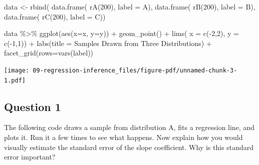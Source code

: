 \documentclass[
  letterpaper,
  DIV=11,
  numbers=noendperiod]{scrreprt}
\newenvironment{Shaded}{\begin{snugshade}}{\end{snugshade}}
\newcommand{\AttributeTok}[1]{\textcolor[rgb]{0.40,0.45,0.13}{#1}}
\newcommand{\DecValTok}[1]{\textcolor[rgb]{0.68,0.00,0.00}{#1}}
\newcommand{\FunctionTok}[1]{\textcolor[rgb]{0.28,0.35,0.67}{#1}}
\newcommand{\NormalTok}[1]{\textcolor[rgb]{0.00,0.23,0.31}{#1}}
\newcommand{\OtherTok}[1]{\textcolor[rgb]{0.00,0.23,0.31}{#1}}
\newcommand{\SpecialCharTok}[1]{\textcolor[rgb]{0.37,0.37,0.37}{#1}}
\newcommand{\StringTok}[1]{\textcolor[rgb]{0.13,0.47,0.30}{#1}}
\begin{document}
\begin{Shaded}
\begin{Highlighting}[]
\NormalTok{data }\OtherTok{\textless{}{-}} \FunctionTok{rbind}\NormalTok{( }
  \FunctionTok{data.frame}\NormalTok{( }\FunctionTok{rA}\NormalTok{(}\DecValTok{200}\NormalTok{), }\AttributeTok{label =} \StringTok{\textquotesingle{}A\textquotesingle{}}\NormalTok{),}
  \FunctionTok{data.frame}\NormalTok{( }\FunctionTok{rB}\NormalTok{(}\DecValTok{200}\NormalTok{), }\AttributeTok{label =} \StringTok{\textquotesingle{}B\textquotesingle{}}\NormalTok{),}
  \FunctionTok{data.frame}\NormalTok{( }\FunctionTok{rC}\NormalTok{(}\DecValTok{200}\NormalTok{), }\AttributeTok{label =} \StringTok{\textquotesingle{}C\textquotesingle{}}\NormalTok{))}
\end{Highlighting}
\end{Shaded}

\begin{Shaded}
\begin{Highlighting}[]
\NormalTok{data }\SpecialCharTok{\%\textgreater{}\%} 
  \FunctionTok{ggplot}\NormalTok{(}\FunctionTok{aes}\NormalTok{(}\AttributeTok{x=}\NormalTok{x, }\AttributeTok{y=}\NormalTok{y)) }\SpecialCharTok{+} 
  \FunctionTok{geom\_point}\NormalTok{() }\SpecialCharTok{+} 
  \FunctionTok{lims}\NormalTok{(}
    \AttributeTok{x =} \FunctionTok{c}\NormalTok{(}\SpecialCharTok{{-}}\DecValTok{2}\NormalTok{,}\DecValTok{2}\NormalTok{), }
    \AttributeTok{y =} \FunctionTok{c}\NormalTok{(}\SpecialCharTok{{-}}\DecValTok{1}\NormalTok{,}\DecValTok{1}\NormalTok{)) }\SpecialCharTok{+} 
  \FunctionTok{labs}\NormalTok{(}\AttributeTok{title =} \StringTok{\textquotesingle{}Samples Drawn from Three Distributions\textquotesingle{}}\NormalTok{) }\SpecialCharTok{+} 
  \FunctionTok{facet\_grid}\NormalTok{(}\AttributeTok{rows=}\FunctionTok{vars}\NormalTok{(label))}
\end{Highlighting}
\end{Shaded}

\texttt{[image: 09-regression-inference\_files/figure-pdf/unnamed-chunk-3-1.pdf]}

\subsection{Question 1}\label{question-1}

The following code draws a sample from distribution A, fits a regression
line, and plots it. Run it a few times to see what happens. Now explain
how you would visually estimate the standard error of the slope
coefficient. Why is this standard error important?
\end{document}
